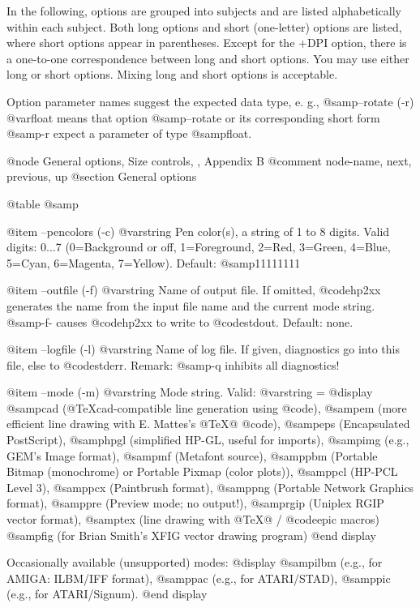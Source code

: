 In the following, options are grouped into subjects and
are listed alphabetically within each subject. Both long options and
short (one-letter) options are listed, where short options appear in
parentheses. Except for the +DPI option, there is a one-to-one correspondence
between long and short options. You may use either long or short options.
Mixing long and short options is acceptable.

Option parameter names suggest the expected data type, e. g.,
@samp{--rotate (-r) @var{float}} means that option @samp{--rotate} or its
corresponding short form @samp{-r} expect a parameter of type @samp{float}.

@node General options, Size controls, , Appendix B
@comment  node-name,  next,  previous,  up
@section General options

@table @samp

@item --pencolors (-c) @var{string}
Pen color(s), a string of 1 to 8 digits.
Valid digits: 0...7 (0=Background or off, 1=Foreground, 2=Red, 3=Green,
4=Blue, 5=Cyan, 6=Magenta, 7=Yellow). Default: @samp{11111111}

@item --outfile (-f) @var{string}
Name of output file. If omitted, @code{hp2xx} generates the name from
the input file name and the current mode string. @samp{-f-} causes
@code{hp2xx} to write to @code{stdout}. Default: none.

@item --logfile (-l) @var{string}
Name of log file. If given, diagnostics go into this file, else to
@code{stderr}. Remark: @samp{-q} inhibits all diagnostics!

@item --mode (-m) @var{string}
Mode string. Valid: @var{string} =
@display
  @samp{cad}  (@TeX{}cad-compatible line generation using @code{}),
  @samp{em}   (more efficient line drawing with E. Mattes's @TeX{}@ @code{}),
  @samp{eps}  (Encapsulated PostScript),
  @samp{hpgl} (simplified HP-GL, useful for imports),
  @samp{img}  (e.g., GEM's Image format),
  @samp{mf}   (Metafont source),
  @samp{pbm}  (Portable Bitmap (monochrome) or Portable Pixmap (color plots)),
  @samp{pcl}  (HP-PCL Level 3),
  @samp{pcx}  (Paintbrush format),
  @samp{png}  (Portable Network Graphics format),
  @samp{pre}  (Preview mode; no output!),
  @samp{rgip} (Uniplex RGIP vector format),
  @samp{tex}  (line drawing with @TeX{}@ / @code{epic} macros)
  @samp{fig}  (for Brian Smith's XFIG vector drawing program)
@end display

Occasionally available (unsupported) modes:
@display
  @samp{ilbm} (e.g., for AMIGA: ILBM/IFF format),
  @samp{pac}  (e.g., for ATARI/STAD),
  @samp{pic}  (e.g., for ATARI/Signum).
@end display

